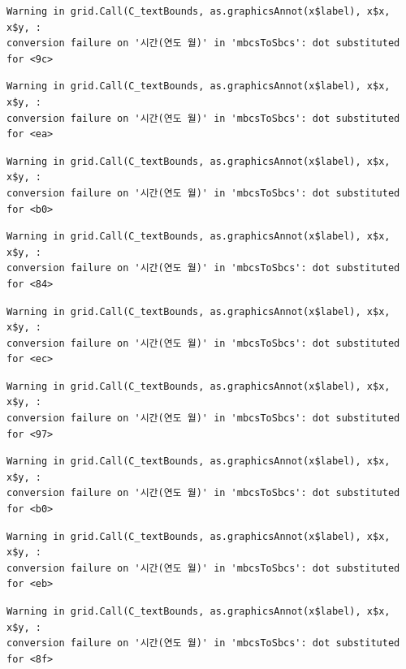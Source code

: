 \documentclass[
  letterpaper,
  DIV=11,
  numbers=noendperiod]{scrreprt}
\begin{document}
\begin{verbatim}
Warning in grid.Call(C_textBounds, as.graphicsAnnot(x$label), x$x, x$y, :
conversion failure on '시간(연도 월)' in 'mbcsToSbcs': dot substituted for <9c>
\end{verbatim}

\begin{verbatim}
Warning in grid.Call(C_textBounds, as.graphicsAnnot(x$label), x$x, x$y, :
conversion failure on '시간(연도 월)' in 'mbcsToSbcs': dot substituted for <ea>
\end{verbatim}

\begin{verbatim}
Warning in grid.Call(C_textBounds, as.graphicsAnnot(x$label), x$x, x$y, :
conversion failure on '시간(연도 월)' in 'mbcsToSbcs': dot substituted for <b0>
\end{verbatim}

\begin{verbatim}
Warning in grid.Call(C_textBounds, as.graphicsAnnot(x$label), x$x, x$y, :
conversion failure on '시간(연도 월)' in 'mbcsToSbcs': dot substituted for <84>
\end{verbatim}

\begin{verbatim}
Warning in grid.Call(C_textBounds, as.graphicsAnnot(x$label), x$x, x$y, :
conversion failure on '시간(연도 월)' in 'mbcsToSbcs': dot substituted for <ec>
\end{verbatim}

\begin{verbatim}
Warning in grid.Call(C_textBounds, as.graphicsAnnot(x$label), x$x, x$y, :
conversion failure on '시간(연도 월)' in 'mbcsToSbcs': dot substituted for <97>
\end{verbatim}

\begin{verbatim}
Warning in grid.Call(C_textBounds, as.graphicsAnnot(x$label), x$x, x$y, :
conversion failure on '시간(연도 월)' in 'mbcsToSbcs': dot substituted for <b0>
\end{verbatim}

\begin{verbatim}
Warning in grid.Call(C_textBounds, as.graphicsAnnot(x$label), x$x, x$y, :
conversion failure on '시간(연도 월)' in 'mbcsToSbcs': dot substituted for <eb>
\end{verbatim}

\begin{verbatim}
Warning in grid.Call(C_textBounds, as.graphicsAnnot(x$label), x$x, x$y, :
conversion failure on '시간(연도 월)' in 'mbcsToSbcs': dot substituted for <8f>
\end{verbatim}
\end{document}
